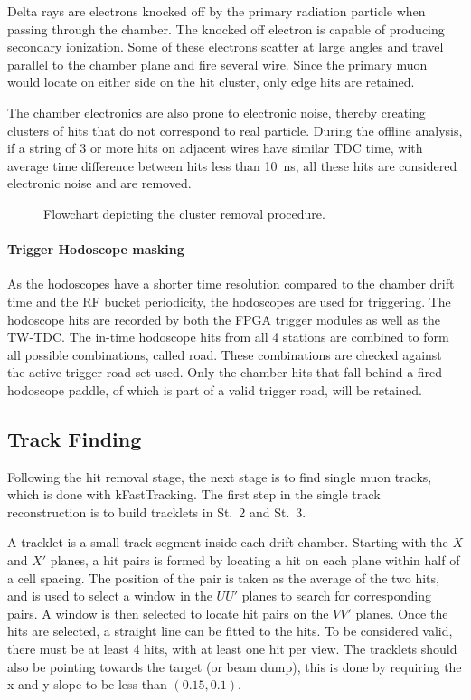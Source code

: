 \documentclass[../main.tex]{subfiles}
\begin{document}
Delta rays are electrons knocked off by the primary radiation particle when passing
through the chamber. The knocked off electron is capable of producing secondary ionization.
Some of these electrons scatter at large angles and travel parallel to the chamber plane
and fire several wire. Since the primary muon would locate on either side on the hit cluster,
only edge hits are retained.

The chamber electronics are also prone to electronic noise, thereby creating clusters of
hits that do not correspond to real particle. During the offline analysis, if a string of
3 or more hits on adjacent wires have similar TDC time, with average time difference between
hits less than \SI{10}{\ns}, all these hits are considered electronic noise and are removed.

\begin{figure}
	\centering
	
	\caption{Flowchart depicting the cluster removal procedure.}
\end{figure}

\paragraph{Trigger Hodoscope masking}
As the hodoscopes have a shorter time resolution compared to the chamber drift time and
the RF bucket periodicity, the hodoscopes are used for triggering. The hodoscope hits
are recorded by both the FPGA trigger modules as well as the TW-TDC. The in-time hodoscope
hits from all 4 stations are combined to form all possible combinations, called road. These
combinations are checked against the active trigger road set used. Only the chamber hits
that fall behind a fired hodoscope paddle, of which is part of a valid trigger road, will be retained.


\subsection{Track Finding}
Following the hit removal stage, the next stage is to find single muon tracks, which is done with kFastTracking.
The first step in the single track reconstruction is to build tracklets in St.~2 and St.~3.

A tracklet is a small track segment inside each drift chamber. Starting with the $X$ and
$X'$ planes, a hit pairs is formed by locating a hit on each plane within half of a cell spacing.
The position of the pair is taken as the average of the two hits, and is used to select a window
in the $UU'$ planes to search for corresponding pairs. A window is then selected to locate hit pairs
on the $VV'$ planes. Once the hits are selected, a straight line can be fitted to the hits.
To be considered valid, there must be at least 4 hits, with at least one hit per view. The tracklets
should also be pointing towards the target (or beam dump), this is done by requiring the x and y slope to be
less than $(0.15,0.1)$.
\end{document}
